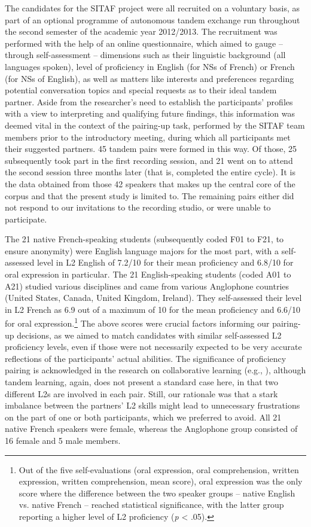 \documentclass[output=paper,colorlinks,citecolor=brown,modfonts,nonflat]{../langscibook}
\begin{document}
The candidates for the SITAF project were all recruited on a voluntary basis, as part of an optional programme of autonomous tandem exchange run throughout the second semester of the academic year 2012/2013. The recruitment was performed with the help of an online questionnaire, which aimed to gauge – through self-assessment – dimensions such as their linguistic background (all languages spoken), level of proficiency in English (for NSs of French) or French (for NSs of English), as well as matters like interests and preferences regarding potential conversation topics and special requests as to their ideal tandem partner. Aside from the researcher’s need to establish the participants' profiles with a view to interpreting and qualifying future findings, this information was deemed vital in the context of the pairing-up task, performed by the SITAF team members prior to the introductory meeting, during which all participants met their suggested partners. 45 tandem pairs were formed in this way. Of those, 25 subsequently took part in the first recording session, and 21 went on to attend the second session three months later (that is, completed the entire cycle). It is the data obtained from those 42 speakers that makes up the central core of the corpus and that the present study is limited to. The remaining pairs either did not respond to our invitations to the recording studio, or were unable to participate.

The 21 native French-speaking students (subsequently coded F01 to F21, to ensure anonymity) were English language majors for the most part, with a self-assessed level in L2 English of 7.2/10 for their mean proficiency and 6.8/10 for oral expression in particular. The 21 English-speaking students (coded A01 to A21) studied various disciplines and came from various Anglophone countries (United States, Canada, United Kingdom, Ireland). They self-assessed their level in L2 French as 6.9 out of a maximum of 10 for the mean proficiency and 6.6/10 for oral expression.\footnote{Out of the five self-evaluations (oral expression, oral comprehension, written expression, written comprehension, mean score), oral expression was the only score where the difference between the two speaker groups – native English vs. native French – reached statistical significance, with the latter group reporting a higher level of L2 proficiency (\textit{p} < .05).} The above scores were crucial factors informing our pairing-up decisions, as we aimed to match candidates with similar self-assessed L2 proficiency levels, even if those were not necessarily expected to be very accurate reflections of the participants’ actual abilities. The significance of proficiency pairing is acknowledged in the research on collaborative learning (e.g., \citealt{StorchAldosari2012}), although tandem learning, again, does not present a standard case here, in that two different L2s are involved in each pair. Still, our rationale was that a stark imbalance between the partners’ L2 skills might lead to unnecessary frustrations on the part of one or both participants, which we preferred to avoid. All 21 native French speakers were female, whereas the Anglophone group consisted of 16 female and 5 male members.
\end{document}
